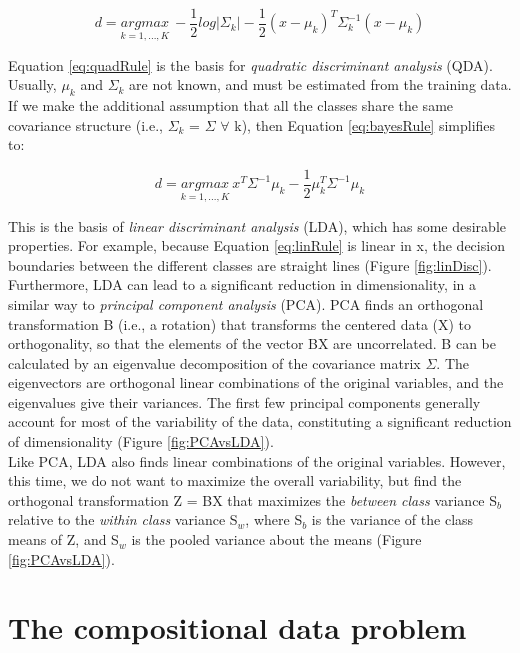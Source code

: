 \documentclass{article}
\begin{document}
\begin{equation}
  \label{eq:quadRule}
d = \underset{k=1,...,K}{argmax} ~ -\frac{1}{2}log|\Sigma_k| -
                            \frac{1}{2}(x-\mu_k)^T\Sigma_k^{-1}(x-\mu_k)
\end{equation}

Equation   \ref{eq:quadRule}   is  the   basis   for  {\it   quadratic
discriminant analysis} (QDA). Usually,  $\mu_k$ and $\Sigma_k$ are not
known, and must  be estimated from the training data.   If we make the
additional assumption  that all the classes share  the same covariance
structure  (i.e., $\Sigma_k$  = $\Sigma$  $\forall$ k),  then Equation
\ref{eq:bayesRule} simplifies to:

\begin{equation}
  \label{eq:linRule}
d = \underset{k=1,...,K}{argmax} ~ x^T\Sigma^{-1}\mu_k-\frac{1}{2}\mu_k^T\Sigma^{-1}\mu_k
\end{equation}

This is the  basis of {\it linear discriminant  analysis} (LDA), which
has  some   desirable  properties.   For   example,  because  Equation
\ref{eq:linRule} is  linear in x, the decision  boundaries between the
different  classes  are  straight  lines  (Figure  \ref{fig:linDisc}).
Furthermore,   LDA   can   lead   to  a   significant   reduction   in
dimensionality, in a similar way to {\it principal component analysis}
(PCA).  PCA  finds an orthogonal  transformation B (i.e.,  a rotation)
that transforms  the centered data  (X) to orthogonality, so  that the
elements of the vector BX are uncorrelated.  B can be calculated by an
eigenvalue  decomposition  of  the  covariance matrix  $\Sigma$.   The
eigenvectors  are  orthogonal  linear  combinations  of  the  original
variables, and  the eigenvalues give  their variances.  The  first few
principal components generally account  for most of the variability of
the  data,  constituting  a  significant reduction  of  dimensionality
(Figure \ref{fig:PCAvsLDA}).\\

Like  PCA,  LDA  also   finds  linear  combinations  of  the  original
variables.  However, this time, we do not want to maximize the overall
variability,  but  find the  orthogonal  transformation  Z  = BX  that
maximizes the {\it between class}  variance S$_b$ relative to the {\it
within class} variance S$_w$, where S$_b$ is the variance of the class
means of Z,  and S$_w$ is the pooled variance  about the means (Figure
\ref{fig:PCAvsLDA}).

\section{The compositional data problem} \label{sec:compositionalProblems}
\end{document}
